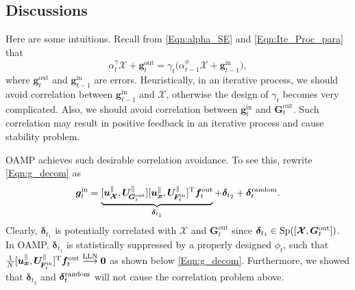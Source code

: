 \documentclass[journal]{IEEEtran}
\newcommand{\mr}{\mathrm}
\newcommand{\BE}{\begin{equation}}
\newcommand{\EE}{\end{equation}}
\renewcommand{\bf}{\bm}
\newcommand{\LC}[1]{\textcolor{red}{#1}}
\begin{document}


 
\subsection{Discussions}
Here are some intuitions. Recall from \eqref{Eqn:alpha_SE} and \eqref{Eqn:Ite_Proc_para} that
\BE
    \alpha_t^{\gamma}\bf{\mathcal{X}}+{\bf{g}}^{\mr{out}}_{t} \!=\! \gamma_t\big(\alpha_{t-1}^{\phi}\bf{\mathcal{X}}+{\bf{g}}^{\mr{in}}_{t-1} \big),
\EE
where ${\bf{g}}^{\mr{out}}_{t}$ and ${\bf{g}}^{\mr{in}}_{t-1}$ are errors. Heuristically, in an iterative process, we should avoid correlation between ${\bf{g}}^{\mr{in}}_{t-1}$ and $\bf{\mathcal{X}}$,  otherwise the design of $\gamma_t $ becomes very complicated. Also, we should avoid correlation between ${\bf{g}}^{\mr{in}}_{t}$ and ${\bf{G}}^{\mr{out}}_{t}$. Such correlation may result in positive feedback in an iterative process and cause stability problem. %

OAMP achieves such desirable correlation avoidance. To see this, rewrite \eqref{Eqn:g_decom} as
\BE
    \bf{g}^{\mr{in}}_t 
     = \underbrace{[\bf{u}^\parallel_{\bf{\mathcal{X}}}, \bf{U}_{\!\bf{G}_t^{\rm out}}^\parallel] [\bf{u}^\parallel_{\bf{x}}, \bf{U}_{\!\bf{F}_t^{\rm in}}^\parallel]^{\rm T}\bf{f}^{\mr{out}}_t}_{\bf{\delta}_{t_1}} + \bf{\delta}_{t_2} +\bf{\delta}_t^{\rm random}.
\EE
Clearly, $\bf{\delta}_{t_1}$ is potentially correlated with $\bf{\mathcal{X}}$ and ${\bf{G}}^{\mr{out}}_{t}$  since  $\bf{\delta}_{t_1}\in{\rm Sp}([\bf{\mathcal{X}}, {\bf{G}}^{\mr{out}}_{t}])$. In OAMP, $\bf{\delta}_{t_1}$ is statistically suppressed by a properly designed $\phi_t $, such that  $\tfrac{1}{N} [\bf{u}^\parallel_{\bf{x}}, \bf{U}_{\!\bf{F}_t^{\rm in}}^\parallel]^{\rm T}\bf{f}^{\mr{out}}_t \overset{\rm LLN}{\longrightarrow}\bf{0}$ as shown below \eqref{Eqn:g_decom}. Furthermore, we showed that $\bf{\delta}_{t_2}$ and $\bf{\delta}_t^{\rm random}$ will not cause the correlation problem above. 
\end{document}
